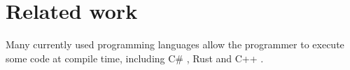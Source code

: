 \section{Related work}
\label{related-work} 

Many currently used programming languages allow the programmer to execute some code at compile time, including C\# \cite{csharp:source_generators,roslyn}, Rust \cite{rust, klabnik2019rust} and C++ \cite{ISO:cpp20}.

